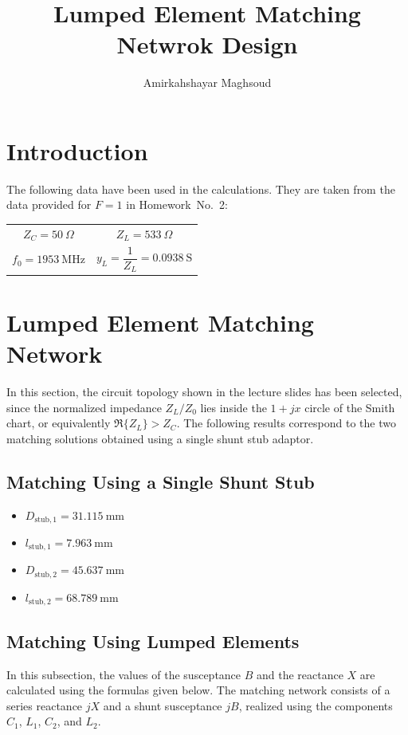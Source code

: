 \documentclass[a4paper,11pt]{article}
\title{\textbf{Lumped Element Matching Netwrok Design}}
\author{Amirkahshayar Maghsoud}
\date{}
\begin{document}
\maketitle
\section{Introduction}

The following data have been used in the calculations. They are taken from the data provided for $F=1$ in Homework~No.~2:

\begin{center}
\begin{tabular}{cc}
$Z_C = 50~\Omega$ & $Z_L = 533~\Omega$ \\[6pt]
$f_0 = 1953~\text{MHz}$ & $y_L = \dfrac{1}{Z_L} = 0.0938~\text{S}$
\end{tabular}
\end{center}


\section{Lumped Element Matching Network}

In this section, the circuit topology shown in the lecture slides has been selected, since the normalized impedance $Z_L/Z_0$ lies inside the $1 + jx$ circle of the Smith chart, or equivalently
$\Re\{Z_L\} > Z_C$.
The following results correspond to the two matching solutions obtained using a single shunt stub adaptor.

\subsection*{Matching Using a Single Shunt Stub}

\begin{itemize}
    \item $D_{\text{stub},1} = 31.115~\text{mm}$
    \item $l_{\text{stub},1} = 7.963~\text{mm}$
    \item $D_{\text{stub},2} = 45.637~\text{mm}$
    \item $l_{\text{stub},2} = 68.789~\text{mm}$
\end{itemize}

\subsection*{Matching Using Lumped Elements}

In this subsection, the values of the susceptance $B$ and the reactance $X$ are calculated using the formulas given below.
The matching network consists of a series reactance $jX$ and a shunt susceptance $jB$, realized using the components
$C_1$, $L_1$, $C_2$, and $L_2$.
\end{document}
